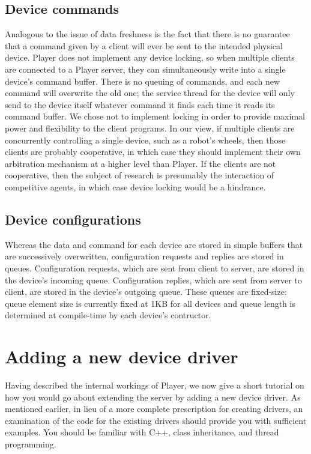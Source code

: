\documentclass[11pt]{report}
\begin{document}
\subsection{Device commands}
Analogous to the issue of data freshness is the fact that there is no guarantee
that a command given by a client will ever be sent to the intended physical
device.  Player does not implement any device locking, so when multiple
clients are connected to a Player server, they can simultaneously write into
a single device's command buffer.  There is no queuing of commands, and each
new command will overwrite the old one; the service thread for the device
will only send to the device itself whatever command it finds each time
it reads its command buffer.  We chose not to implement locking in order
to provide maximal power and flexibility to the client programs.  In our
view, if multiple clients are concurrently controlling a single device,
such as a robot's wheels, then those clients are probably cooperative,
in which case they should implement their own arbitration mechanism at a
higher level than Player.  If the clients are not cooperative, then the
subject of research is presumably the interaction of competitive agents,
in which case device locking would be a hindrance.

\subsection{Device configurations}
Whereas the data and command for each device are stored in simple buffers that
are successively overwritten, configuration requests and replies are stored
in queues.  Configuration requests, which are sent from client to server,
are stored in the device's incoming queue.  Configuration replies, which
are sent from server to client, are stored in the device's outgoing queue.
These queues are fixed-size: queue element size is currently fixed at 1KB
for all devices and queue length is determined at compile-time by each
device's contructor.

\section{Adding a new device driver}
Having described the internal workings of Player, we now give a short
tutorial on how you would go about extending the server by adding a new
device driver.  As mentioned earlier, in lieu of a more complete prescription 
for creating drivers, an examination of the code for the existing drivers 
should provide you with sufficient examples.  You should be familiar with C++,
class inheritance, and thread programming.
\end{document}
